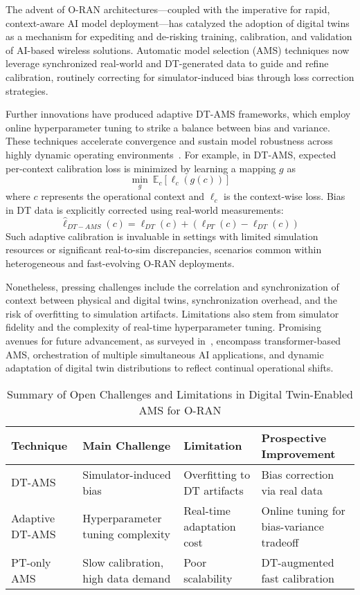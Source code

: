 \documentclass[sigconf]{acmart}
\begin{document}
The advent of O-RAN architectures—coupled with the imperative for rapid, context-aware AI model deployment—has catalyzed the adoption of digital twins as a mechanism for expediting and de-risking training, calibration, and validation of AI-based wireless solutions. Automatic model selection (AMS) techniques now leverage synchronized real-world and DT-generated data to guide and refine calibration, routinely correcting for simulator-induced bias through loss correction strategies.

Further innovations have produced adaptive DT-AMS frameworks, which employ online hyperparameter tuning to strike a balance between bias and variance. These techniques accelerate convergence and sustain model robustness across highly dynamic operating environments~\cite{ref37}. For example, in DT-AMS, expected per-context calibration loss is minimized by learning a mapping $g$ as
\[
\min_{g}~\mathbb{E}_{c}[\ell_{c}(g(c))]
\]
where $c$ represents the operational context and $\ell_{c}$ is the context-wise loss. Bias in DT data is explicitly corrected using real-world measurements:
\[
\hat{\ell}_{DT-AMS}(c) = \ell_{DT}(c) + (\ell_{PT}(c) - \ell_{DT}(c))
\]
Such adaptive calibration is invaluable in settings with limited simulation resources or significant real-to-sim discrepancies, scenarios common within heterogeneous and fast-evolving O-RAN deployments.

Nonetheless, pressing challenges include the correlation and synchronization of context between physical and digital twins, synchronization overhead, and the risk of overfitting to simulation artifacts. Limitations also stem from simulator fidelity and the complexity of real-time hyperparameter tuning. Promising avenues for future advancement, as surveyed in~\cite{ref37}, encompass transformer-based AMS, orchestration of multiple simultaneous AI applications, and dynamic adaptation of digital twin distributions to reflect continual operational shifts.

\begin{table*}[htbp]
\centering
\caption{Summary of Open Challenges and Limitations in Digital Twin-Enabled AMS for O-RAN}
\label{tab:dt_ams_challenges}
\begin{adjustbox}{max width=\textwidth}
\begin{tabular}{@{}llll@{}}
\toprule
Technique & Main Challenge & Limitation & Prospective Improvement \\
\midrule
DT-AMS & Simulator-induced bias & Overfitting to DT artifacts & Bias correction via real data \\
Adaptive DT-AMS & Hyperparameter tuning complexity & Real-time adaptation cost & Online tuning for bias-variance tradeoff \\
PT-only AMS & Slow calibration, high data demand & Poor scalability & DT-augmented fast calibration \\
\bottomrule
\end{tabular}
\end{adjustbox}
\end{table*}
\end{document}
